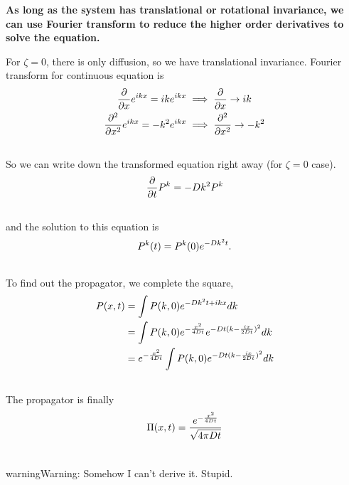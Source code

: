 \documentclass[letterpaper,10pt,english]{sphinxmanual}
\begin{document}
\textbf{As long as the system has translational or rotational invariance, we can use Fourier transform to reduce the higher order derivatives to solve the equation.}

For $\zeta =0$, there is only diffusion, so we have translational invariance. Fourier transform for continuous equation is
\begin{gather}
\begin{split}\frac{\partial}{\partial x} e^{ikx}=ike^{ikx} &\implies \frac{\partial}{\partial x} \to ik \\
\frac{\partial^2}{\partial x^2} e^{ikx} = -k^2 e^{ikx} & \implies \frac{\partial^2}{\partial x^2} \to -k^2\end{split}\notag\\\begin{split}\end{split}\notag
\end{gather}
So we can write down the transformed equation right away (for $\zeta=0$ case).
\begin{gather}
\begin{split}\frac{\partial}{\partial t}P^k = -D k^2 P^k\end{split}\notag\\\begin{split}\end{split}\notag
\end{gather}
and the solution to this equation is
\begin{gather}
\begin{split}P^k(t) = P^k(0) e^{-D k^2 t} .\end{split}\notag\\\begin{split}\end{split}\notag
\end{gather}
To find out the propagator, we complete the square,
\begin{gather}
\begin{split}P(x,t) & = \int P(k,0) e^{-Dk^2t+ikx} dk \\
& = \int P(k,0) e^{-\frac{x^2}{4Dt}} e^{-Dt(k-\frac{ix}{2Dt})^2 }dk \\
& = e^{-\frac{x^2}{4Dt}}  \int P(k,0) e^{-Dt(k-\frac{ix}{2Dt})^2 }dk\end{split}\notag\\\begin{split}\end{split}\notag
\end{gather}
The propagator is finally
\begin{gather}
\begin{split}\Pi(x,t) = \frac{e^{-\frac{x^2}{4Dt}}}{\sqrt{4\pi Dt}}\end{split}\notag\\\begin{split}\end{split}\notag
\end{gather}
\begin{notice}{warning}{Warning:}
Somehow I can't derive it. Stupid.
\end{notice}
\end{document}
